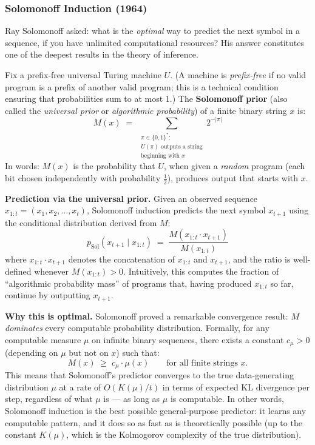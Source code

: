 \documentclass[11pt, a4paper]{article}
\begin{document}
\subsubsection{Solomonoff Induction (1964)}

Ray Solomonoff asked: what is the \emph{optimal} way to predict the next
symbol in a sequence, if you have unlimited computational resources?
His answer constitutes one of the deepest results in the theory of
inference.

\begin{definition}[title={Solomonoff's Universal Prior}]
Fix a prefix-free universal Turing machine $U$. (A machine is
\emph{prefix-free} if no valid program is a prefix of another valid
program; this is a technical condition ensuring that probabilities sum
to at most 1.) The \textbf{Solomonoff prior} (also called the
\emph{universal prior} or \emph{algorithmic probability}) of a finite
binary string $x$ is:
\[
M(x) \;=\; \sum_{\substack{\pi \in \{0,1\}^*:\\
  U(\pi) \text{ outputs a string}\\ \text{beginning with } x}}
  2^{-|\pi|}
\]
In words: $M(x)$ is the probability that $U$, when given a \emph{random}
program (each bit chosen independently with probability $\frac{1}{2}$),
produces output that starts with $x$.
\end{definition}

\textbf{Prediction via the universal prior.} Given an observed sequence
$x_{1:t} = (x_1, x_2, \ldots, x_t)$, Solomonoff induction predicts the
next symbol $x_{t+1}$ using the conditional distribution derived from $M$:
\[
p_{\text{Sol}}(x_{t+1} \mid x_{1:t})
\;=\; \frac{M(x_{1:t} \cdot x_{t+1})}{M(x_{1:t})}
\]
where $x_{1:t} \cdot x_{t+1}$ denotes the concatenation of $x_{1:t}$ and
$x_{t+1}$, and the ratio is well-defined whenever $M(x_{1:t}) > 0$.
Intuitively, this computes the fraction of ``algorithmic probability
mass'' of programs that, having produced $x_{1:t}$ so far, continue by
outputting $x_{t+1}$.

\textbf{Why this is optimal.} Solomonoff proved a remarkable convergence
result: $M$ \emph{dominates} every computable probability distribution.
Formally, for any computable measure $\mu$ on infinite binary sequences,
there exists a constant $c_\mu > 0$ (depending on $\mu$ but not on $x$)
such that:
\[
M(x) \;\geq\; c_\mu \cdot \mu(x) \qquad \text{for all finite strings } x.
\]
This means that Solomonoff's predictor converges to the true data-generating
distribution $\mu$ at a rate of $O(K(\mu) / t)$ in terms of expected
KL divergence per step, regardless of what $\mu$ is --- as long as $\mu$
is computable. In other words, Solomonoff induction is the best possible
general-purpose predictor: it learns any computable pattern, and it does
so as fast as is theoretically possible (up to the constant $K(\mu)$,
which is the Kolmogorov complexity of the true distribution).
\end{document}
